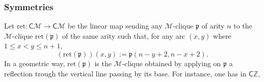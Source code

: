 \documentclass[10pt,reqno]{amsart}
\numberwithin{equation}{subsection}
\renewcommand{\leq}{\leqslant}
\newcommand{\Z}{\mathbb{Z}}
\newcommand{\Mca}{\mathcal{M}}
\newcommand{\Pfr}{\mathfrak{p}}
\newcommand{\Cli}{\mathsf{C}}
\newcommand{\Returned}{\mathrm{ret}}
\begin{document}
\subsubsection{Symmetries}
Let $\Returned : \Cli\Mca \to \Cli\Mca$ be the linear map sending any
$\Mca$-clique $\Pfr$ of arity $n$ to the $\Mca$-clique $\Returned(\Pfr)$
of the same arity such that, for any arc $(x, y)$ where
$1 \leq x < y \leq n + 1$,
\begin{equation} \label{equ:returned_map_Cli_M}
    \left(\Returned(\Pfr)\right)(x, y) := \Pfr(n - y + 2, n - x + 2).
\end{equation}
In a geometric way, $\Returned(\Pfr)$ is the $\Mca$-clique obtained by
applying on $\Pfr$ a reflection trough the vertical line passing by its
base. For instance, one has in $\Cli\Z$,
\end{document}
